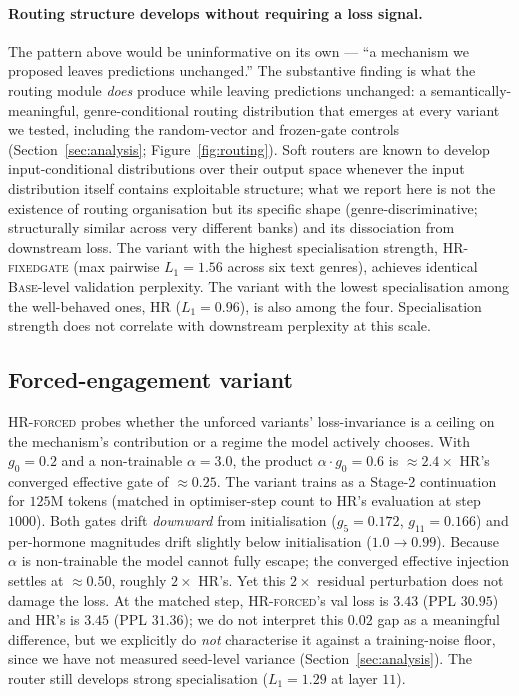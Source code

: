 \paragraph{Routing structure develops without requiring a loss signal.} The pattern above would be uninformative on its own --- ``a mechanism we proposed leaves predictions unchanged.'' The substantive finding is what the routing module \emph{does} produce while leaving predictions unchanged: a semantically-meaningful, genre-conditional routing distribution that emerges at every variant we tested, including the random-vector and frozen-gate controls (Section~\ref{sec:analysis}; Figure~\ref{fig:routing}). Soft routers are known to develop input-conditional distributions over their output space whenever the input distribution itself contains exploitable structure; what we report here is not the existence of routing organisation but its specific shape (genre-discriminative; structurally similar across very different banks) and its dissociation from downstream loss. The variant with the highest specialisation strength, \textsc{HR-fixedgate} (max pairwise $L_1 = 1.56$ across six text genres), achieves identical \textsc{Base}-level validation perplexity. The variant with the lowest specialisation among the well-behaved ones, \textsc{HR} ($L_1 = 0.96$), is also among the four. Specialisation strength does not correlate with downstream perplexity at this scale.

\subsection{Forced-engagement variant}
\label{subsec:hrforced}

\textsc{HR-forced} probes whether the unforced variants' loss-invariance is a ceiling on the mechanism's contribution or a regime the model actively chooses. With $g_0 = 0.2$ and a non-trainable $\alpha = 3.0$, the product $\alpha \cdot g_0 = 0.6$ is $\approx 2.4\times$ \textsc{HR}'s converged effective gate of $\approx 0.25$. The variant trains as a Stage-2 continuation for $125$M tokens (matched in optimiser-step count to \textsc{HR}'s evaluation at step $1000$). Both gates drift \emph{downward} from initialisation ($g_5 = 0.172$, $g_{11} = 0.166$) and per-hormone magnitudes drift slightly below initialisation ($1.0 \to 0.99$). Because $\alpha$ is non-trainable the model cannot fully escape; the converged effective injection settles at $\approx 0.50$, roughly $2\times$ \textsc{HR}'s. Yet this $2\times$ residual perturbation does not damage the loss. At the matched step, \textsc{HR-forced}'s val loss is $3.43$ (PPL $30.95$) and \textsc{HR}'s is $3.45$ (PPL $31.36$); we do not interpret this $0.02$ gap as a meaningful difference, but we explicitly do \emph{not} characterise it against a training-noise floor, since we have not measured seed-level variance (Section~\ref{sec:analysis}). The router still develops strong specialisation ($L_1 = 1.29$ at layer $11$).

